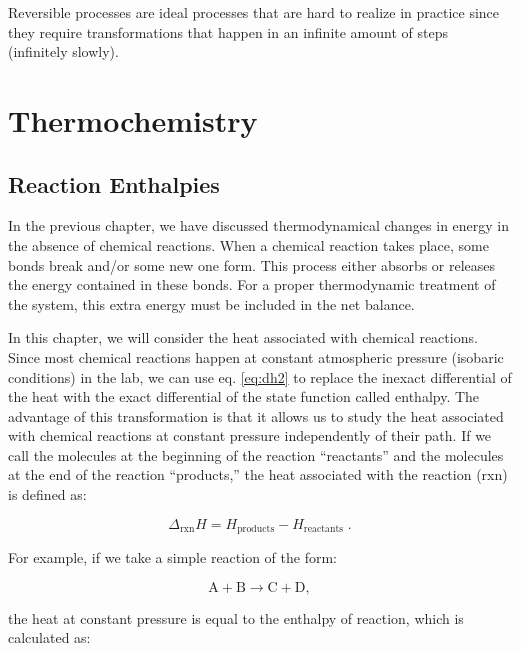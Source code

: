 \documentclass[
]{book}
\theoremstyle{definition}
\theoremstyle{definition}
\theoremstyle{definition}
\theoremstyle{remark}
\begin{document}
Reversible processes are ideal processes that are hard to realize in practice since they require transformations that happen in an infinite amount of steps (infinitely slowly).

\newcommand*{\standardstate}{{-\kern-6pt{\ominus}\kern-6pt-}}

\hypertarget{Thermochemistry}{%
\chapter{Thermochemistry}\label{Thermochemistry}}

\hypertarget{rxnenthalpy}{%
\section{Reaction Enthalpies}\label{rxnenthalpy}}

In the previous chapter, we have discussed thermodynamical changes in energy in the absence of chemical reactions. When a chemical reaction takes place, some bonds break and/or some new one form. This process either absorbs or releases the energy contained in these bonds. For a proper thermodynamic treatment of the system, this extra energy must be included in the net balance.

In this chapter, we will consider the heat associated with chemical reactions. Since most chemical reactions happen at constant atmospheric pressure (isobaric conditions) in the lab, we can use eq. \eqref{eq:dh2} to replace the inexact differential of the heat with the exact differential of the state function called enthalpy. The advantage of this transformation is that it allows us to study the heat associated with chemical reactions at constant pressure independently of their path. If we call the molecules at the beginning of the reaction ``reactants'' and the molecules at the end of the reaction ``products,'' the heat associated with the reaction (rxn) is defined as:

\begin{equation}
  \Delta_{\text{rxn}} H = H_{\text{products}}-H_{\text{reactants}} \; .
  \label{eq:DHrxn1}
\end{equation}

For example, if we take a simple reaction of the form:

\[ \mathrm{A} + \mathrm{B} \rightarrow \mathrm{C} + \mathrm{D}, \]

the heat at constant pressure is equal to the enthalpy of reaction, which is calculated as:
\end{document}
